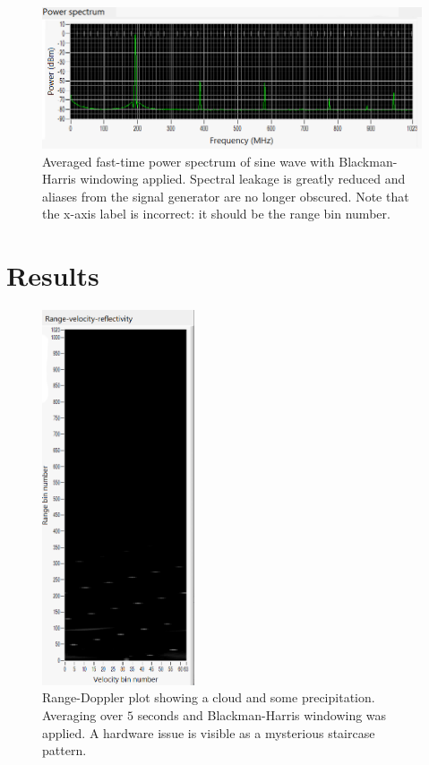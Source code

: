 \documentclass{article}
\begin{document}
\begin{figure}[h]
	\centering
	\includegraphics[width=\textwidth]{window-bmh}
	\caption{Averaged fast-time power spectrum of sine wave with Blackman-Harris windowing applied. Spectral leakage is greatly reduced and aliases from the signal generator are no longer obscured. Note that the x-axis label is incorrect: it should be the range bin number.}
	\label{fig:WindowBMH}
\end{figure}

\section{Results}

\begin{figure}[h]
	\centering
	\includegraphics[width=0.4\textwidth]{working-cloud_range-doppler}
	\caption{Range-Doppler plot showing a cloud and some precipitation. Averaging over \(5\) seconds and Blackman-Harris windowing was applied. A hardware issue is visible as a mysterious staircase pattern.}
	\label{fig:WorkingCloudRangeDoppler}
\end{figure}
\end{document}
